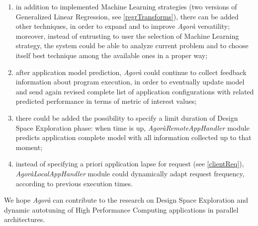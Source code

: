 \begin{enumerate}

	\item in addition to implemented Machine Learning strategies (two versions of Generalized Linear Regression, see \ref{regrTransforms}), there can be added other techniques, in order to expand and to improve \textit{Agorà} versatility; moreover, instead of entrusting to user the selection of Machine Learning strategy, the system could be able to analyze current problem and to choose itself best technique among the available ones in a proper way;

	\item after application model prediction, \textit{Agorà} could continue to collect feedback information about program execution, in order to eventually update model and send again revised complete list of application configurations with related predicted performance in terms of metric of interest values;

	\item there could be added the possibility to specify a limit duration of Design Space Exploration phase: when time is up, \textit{AgoràRemoteAppHandler} module predicts application complete model with all information collected up to that moment;

	\item instead of specifying a priori application lapse for request (see \ref{clientReq}), \textit{AgoràLocalAppHandler} module could dynamically adapt request frequency, according to previous execution times.

\end{enumerate}

We hope \textit{Agorà} can contribute to the research on Design Space Exploration and dynamic autotuning of High Performance Computing applications in parallel architectures.

